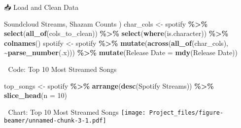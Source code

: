 \documentclass[
  ignorenonframetext,
]{beamer}
\newenvironment{Shaded}{\begin{snugshade}}{\end{snugshade}}
\newcommand{\AttributeTok}[1]{\textcolor[rgb]{0.13,0.29,0.53}{#1}}
\newcommand{\DecValTok}[1]{\textcolor[rgb]{0.00,0.00,0.81}{#1}}
\newcommand{\FunctionTok}[1]{\textcolor[rgb]{0.13,0.29,0.53}{\textbf{#1}}}
\newcommand{\NormalTok}[1]{#1}
\newcommand{\OtherTok}[1]{\textcolor[rgb]{0.56,0.35,0.01}{#1}}
\newcommand{\SpecialCharTok}[1]{\textcolor[rgb]{0.81,0.36,0.00}{\textbf{#1}}}
\newcommand{\StringTok}[1]{\textcolor[rgb]{0.31,0.60,0.02}{#1}}
\begin{document}
\begin{frame}[fragile]{📥 Load and Clean Data}
\begin{Shaded}
\begin{Highlighting}[]
  \StringTok{\textquotesingle{}Soundcloud Streams\textquotesingle{}}\NormalTok{, }\StringTok{\textquotesingle{}Shazam Counts\textquotesingle{}}
\NormalTok{)}
\NormalTok{char\_cols }\OtherTok{\textless{}{-}}\NormalTok{ spotify }\SpecialCharTok{\%\textgreater{}\%}
  \FunctionTok{select}\NormalTok{(}\FunctionTok{all\_of}\NormalTok{(cols\_to\_clean)) }\SpecialCharTok{\%\textgreater{}\%}
  \FunctionTok{select}\NormalTok{(}\FunctionTok{where}\NormalTok{(is.character)) }\SpecialCharTok{\%\textgreater{}\%}
  \FunctionTok{colnames}\NormalTok{()}
\NormalTok{spotify }\OtherTok{\textless{}{-}}\NormalTok{ spotify }\SpecialCharTok{\%\textgreater{}\%}
  \FunctionTok{mutate}\NormalTok{(}\FunctionTok{across}\NormalTok{(}\FunctionTok{all\_of}\NormalTok{(char\_cols), }\SpecialCharTok{\textasciitilde{}}\FunctionTok{parse\_number}\NormalTok{(.x))) }\SpecialCharTok{\%\textgreater{}\%}
  \FunctionTok{mutate}\NormalTok{(}\StringTok{\textasciigrave{}}\AttributeTok{Release Date}\StringTok{\textasciigrave{}} \OtherTok{=} \FunctionTok{mdy}\NormalTok{(}\StringTok{\textasciigrave{}}\AttributeTok{Release Date}\StringTok{\textasciigrave{}}\NormalTok{))}
\end{Highlighting}
\end{Shaded}
\end{frame}

\begin{frame}[fragile]{🎵 Code: Top 10 Most Streamed Songs}
\label{code-top-10-most-streamed-songs}
\begin{Shaded}
\begin{Highlighting}[]
\NormalTok{  top\_songs }\OtherTok{\textless{}{-}}\NormalTok{ spotify }\SpecialCharTok{\%\textgreater{}\%}
  \FunctionTok{arrange}\NormalTok{(}\FunctionTok{desc}\NormalTok{(}\StringTok{\textasciigrave{}}\AttributeTok{Spotify Streams}\StringTok{\textasciigrave{}}\NormalTok{)) }\SpecialCharTok{\%\textgreater{}\%}
  \FunctionTok{slice\_head}\NormalTok{(}\AttributeTok{n =} \DecValTok{10}\NormalTok{)}
\end{Highlighting}
\end{Shaded}
\end{frame}

\begin{frame}{🎵 Chart: Top 10 Most Streamed Songs}
\label{chart-top-10-most-streamed-songs}
\texttt{[image: Project\_files/figure-beamer/unnamed-chunk-3-1.pdf]}
\end{frame}
\end{document}
